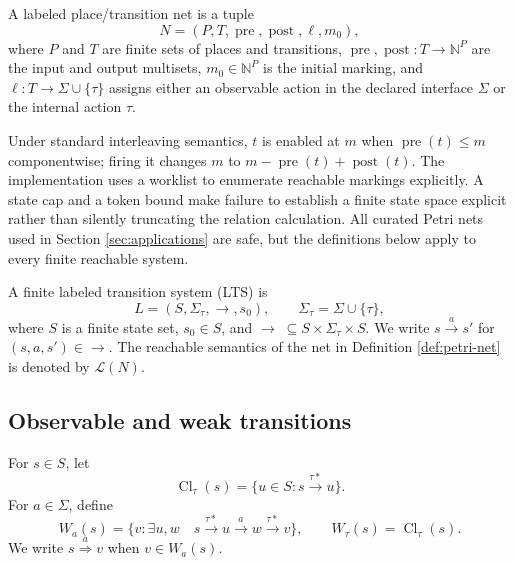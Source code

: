 \documentclass{ws-jbcb}
\numberwithin{equation}{section}
\newcommand{\TAU}{\tau}
\newcommand{\xRightarrow}[1]{\stackrel{#1}{\Longrightarrow}}
\newcommand{\LTS}{\mathcal{L}}
\begin{document}
\begin{definition}\label{def:petri-net}
A labeled place/transition net is a tuple
\begin{equation}\label{eq:petri-net}
 N=(P,T,\operatorname{pre},\operatorname{post},\ell,m_0),
\end{equation}
where $P$ and $T$ are finite sets of places and transitions,
$\operatorname{pre},\operatorname{post}:T\to\mathbb{N}^{P}$ are the input and
output multisets, $m_0\in\mathbb{N}^{P}$ is the initial marking, and
$\ell:T\to\Sigma\cup\{\TAU\}$ assigns either an observable action in the declared
interface $\Sigma$ or the internal action $\TAU$.
\end{definition}

Under standard interleaving semantics,\cite{Murata1989} $t$ is enabled at $m$ when
$\operatorname{pre}(t)\leq m$ componentwise; firing it changes $m$ to
$m-\operatorname{pre}(t)+\operatorname{post}(t)$. The implementation uses
a worklist to enumerate reachable markings explicitly. A state cap and a token
bound make failure to establish a finite state space explicit rather than silently
truncating the relation calculation. All curated Petri nets used in Section
\ref{sec:applications} are safe, but the definitions below apply to every finite
reachable system.

\begin{definition}\label{def:lts}
A finite labeled transition system (LTS) is
\begin{equation}\label{eq:lts}
 L=(S,\Sigma_{\TAU},\longrightarrow,s_0),\qquad
 \Sigma_{\TAU}=\Sigma\cup\{\TAU\},
\end{equation}
where $S$ is a finite state set, $s_0\in S$, and
$\longrightarrow\;\subseteq S\times\Sigma_{\TAU}\times S$. We write
$s\xrightarrow{a}s'$ for $(s,a,s')\in\longrightarrow$. The reachable semantics
of the net in Definition \ref{def:petri-net} is denoted by $\LTS(N)$.
\end{definition}

\subsection{Observable and weak transitions}\label{sec:weak-transitions}

\begin{definition}\label{def:weak-move}
For $s\in S$, let
\begin{equation}\label{eq:tau-closure}
 \operatorname{Cl}_{\TAU}(s)=
 \{u\in S:s\xrightarrow{\TAU *}u\}.
\end{equation}
For $a\in\Sigma$, define
\begin{equation}\label{eq:weak-target}
 W_a(s)=\{v:\exists u,w\quad
 s\xrightarrow{\TAU *}u\xrightarrow{a}w\xrightarrow{\TAU *}v\},
 \qquad W_{\TAU}(s)=\operatorname{Cl}_{\TAU}(s).
\end{equation}
We write $s\xRightarrow{a}v$ when $v\in W_a(s)$.
\end{definition}
\end{document}
